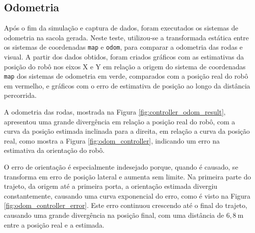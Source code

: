 \documentclass[repeatfields,xlists,xpacks,oneside,yearsonly]{ufrgscca}
\begin{document}
\subsection{Odometria}

Após o fim da simulação e captura de dados, foram executados os
sistemas de odometria na sacola gerada. Neste teste, utilizou-se a
transformada estática entre os sistemas de coordenadas \texttt{map} e
\texttt{odom}, para comparar a odometria das rodas e visual. A partir
dos dados obtidos, foram criados gráficos com as estimativas da
posição do robô nos eixos X e Y em relação a origem do sistema de
coordenadas \texttt{map} dos sistemas de odometria em verde,
comparados com a posição real do robô em vermelho, e gráficos com o
erro de estimativa de posição ao longo da distância percorrida.

A odometria das rodas, mostrada na Figura
\ref{fig:controller_odom_result}, apresentou uma grande divergência
em relação a posição real do robô, com a curva da posição estimada
inclinada para a direita, em relação a curva da posição real, como
mostra a Figura \ref{fig:odom_controller}, indicando um erro na
estimativa da orientação do robô.

O erro de orientação é especialmente indesejado porque, quando é
causado, se transforma em erro de posição lateral e aumenta sem
limite\cite{borenstein}. Na primeira parte do trajeto, da origem até
a primeira porta, a orientação estimada divergiu constantemente,
causando uma curva exponencial do erro, como é visto na Figura
\ref{fig:odom_controller_error}. Este erro continuou crescendo até o
final do trajeto, causando uma grande divergência na posição final,
com uma distância de $6,8~\si{\meter}$ entre a posição real e a
estimada.
\end{document}
